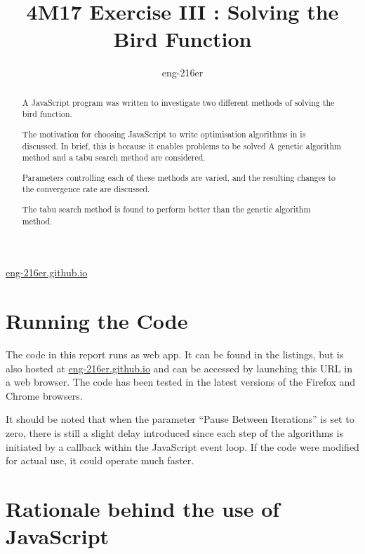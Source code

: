 \documentclass[a4paper,12pt]{article}
\begin{document}

\title{4M17 Exercise III : Solving the Bird Function}
\author{eng-216er}

\maketitle

\begin{center}
\url{eng-216er.github.io}
\end{center}


\begin{abstract}
A JavaScript program was written to investigate two different methods of solving the bird function.

The motivation for choosing JavaScript to write optimisation algorithms in is discussed.
In brief, this is because it enables problems to be solved 
A genetic algorithm method and a tabu search method are considered.

Parameters controlling each of these methods are varied, and the resulting changes to the convergence rate are discussed.

The tabu search method is found to perform better than the genetic algorithm method.


\end{abstract}

\newpage
\tableofcontents
\newpage
\listoffigures
\newpage

\section{Running the Code}

The code in this report runs as web app.
It can be found in the listings, but is also hosted at \url{eng-216er.github.io} and can be accessed by launching this URL in a web browser. 
The code has been tested in the latest versions of the Firefox and Chrome browsers.  

It should be noted that when the parameter ``Pause Between Iterations'' is set to zero, there is still a slight delay introduced since each step of the algorithms is initiated by a callback within the JavaScript event loop. If the code were modified for actual use, it could operate much faster.

\section{Rationale behind the use of JavaScript}
\end{document}
